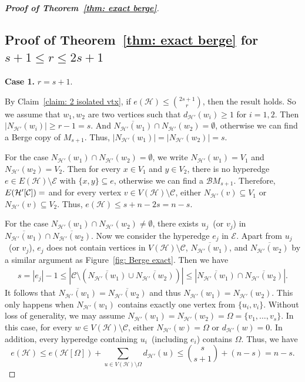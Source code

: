 \documentclass[11pt]{article}
\numberwithin{equation}{section}
\newcommand\cB{{\mathcal B}}
\newcommand\cC{{\mathcal C}}
\newcommand\cE{{\mathcal E}}
\newcommand\cH{{\mathcal H}}
\begin{document}
\begin{proof}[\bf Proof of Theorem~\ref{thm: exact berge}]


    \subsection{\normalsize Proof of Theorem~\ref{thm: exact berge} for $s+1 \le r \le 2s+1$}

    \smallskip
    \noindent\textbf{Case 1.} $r=s+1$.
    \smallskip
    \smallskip

    By Claim~\ref{claim: 2 isolated vtx}, if $e(\cH)\leq \binom{2s+1}{r}$, then the result holds.
    So we assume that $w_1,w_2$ are two vertices  such that $d_{\cH'}(w_i)\geq 1$ for $i=1,2$.
    Then $|N_{\cH'}(w_i)|\geq r-1=s$.
    And $\overline{N_{\cH'}(w_1)}\cap N_{\cH'}(w_2)=\emptyset$, otherwise we can find a Berge copy of $M_{s+1}$. Thus, $|N_{\cH'}(w_1)| = |N_{\cH'}(w_2)| = s$.

    For the case $N_{\cH'}(w_1)\cap N_{\cH'}(w_2)=\emptyset$, we write $N_{\cH'}(w_1)=V_1$ and $N_{\cH'}(w_2)=V_2$. Then for every $x\in V_1$ and $y\in V_2$, there is no hyperedge $e \in E(\cH)\setminus \cE$ with $\{x,y\}\subseteq e$, otherwise we can find a $\cB M_{s+1}$. Therefore, $E(\cH'[\cC])=\empty$ and for every vertex $v\in V(\cH)\setminus \cC$, either $N_{\cH'}(v) \subseteq V_1$ or $N_{\cH'}(v) \subseteq V_2 $. Thus, $e(\cH)\leq s+n-2s = n-s$.


    For the case $N_{\cH'}(w_1)\cap N_{\cH'}(w_2) \neq \emptyset$,  there exists $u_j$~(or $v_j$) in $\overline{N_{\cH'}(w_1)}\cap \overline{N_{\cH'}(w_2)}$. Now we consider the hyperedge $e_j$ in $\cE$.
    Apart from $u_j$~(or $v_j$), $e_j$ does not contain vertices in $V(\cH)\setminus \cC$,  $\overline{N_{\cH'}(w_1)}$, and  $\overline{N_{\cH'}(w_2)}$ by a similar argument as Figure~\ref{fig: Berge exact}.
    Then we have
    \begin{align*}
    s = |e_j| -1 \le  |\cC \setminus (\overline{N_{\cH'}(w_1)} \cup \overline{N_{\cH'}(w_2)})| \le |\overline{N_{\cH'}(w_1)} \cap \overline{N_{\cH'}(w_2)}|.
    \end{align*}
     It follows that $\overline{N_{\cH'}(w_1)} = \overline{N_{\cH'}(w_2)}$ and thus $N_{\cH'}(w_1) = N_{\cH'}(w_2)$.
    This only happens when $N_{\cH'}(w_1)$ contains exactly one vertex from $\{u_i,v_i\}$.
    Without loss of generality, we may assume $N_{\cH'}(w_1) = N_{\cH'}(w_2) = \Omega=\{v_1,\dots,v_s\}$.
    In this case, for every $w \in V(\cH) \setminus \cC$, either $N_{\cH'}(w) = \Omega$ or $d_{\cH'}(w) = 0$.
    In addition, every hyperedge containing $u_i$~(including $e_i$) contains $\Omega$.
    Thus, we have
    \[
        e(\cH)\leq e(\cH[\Omega])+\sum_{u\in V(\cH)\setminus\Omega }d_{\cH'}(u)\leq \binom{s}{s+1}+(n-s)=n-s.
    \]



\end{proof}
\end{document}

